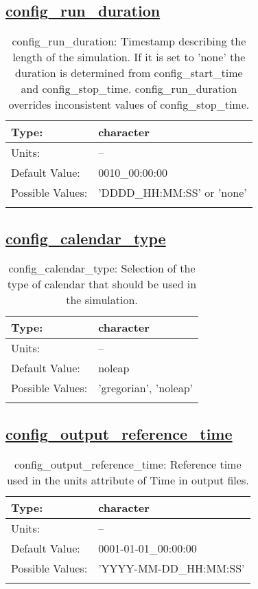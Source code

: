 \subsection[config\_run\_duration]{\hyperref[sec:nm_tab_time_management]{config\_run\_duration}}
\label{subsec:nm_sec_config_run_duration}
\begin{center}
\begin{longtable}{| p{2.0in} || p{4.0in} |}
    \hline
    Type: & character \\
    \hline
    Units: & -- \\
    \hline
    Default Value: & 0010\_00:00:00 \\
    \hline
    Possible Values: & 'DDDD\_HH:MM:SS' or 'none' \\
    \hline
    \caption{config\_run\_duration: Timestamp describing the length of the simulation. If it is set to 'none' the duration is determined from config\_start\_time and config\_stop\_time. config\_run\_duration overrides inconsistent values of config\_stop\_time.}
\end{longtable}
\end{center}
\subsection[config\_calendar\_type]{\hyperref[sec:nm_tab_time_management]{config\_calendar\_type}}
\label{subsec:nm_sec_config_calendar_type}
\begin{center}
\begin{longtable}{| p{2.0in} || p{4.0in} |}
    \hline
    Type: & character \\
    \hline
    Units: & -- \\
    \hline
    Default Value: & noleap \\
    \hline
    Possible Values: & 'gregorian', 'noleap' \\
    \hline
    \caption{config\_calendar\_type: Selection of the type of calendar that should be used in the simulation.}
\end{longtable}
\end{center}
\subsection[config\_output\_reference\_time]{\hyperref[sec:nm_tab_time_management]{config\_output\_reference\_time}}
\label{subsec:nm_sec_config_output_reference_time}
\begin{center}
\begin{longtable}{| p{2.0in} || p{4.0in} |}
    \hline
    Type: & character \\
    \hline
    Units: & -- \\
    \hline
    Default Value: & 0001-01-01\_00:00:00 \\
    \hline
    Possible Values: & 'YYYY-MM-DD\_HH:MM:SS' \\
    \hline
    \caption{config\_output\_reference\_time: Reference time used in the units attribute of Time in output files.}
\end{longtable}
\end{center}
